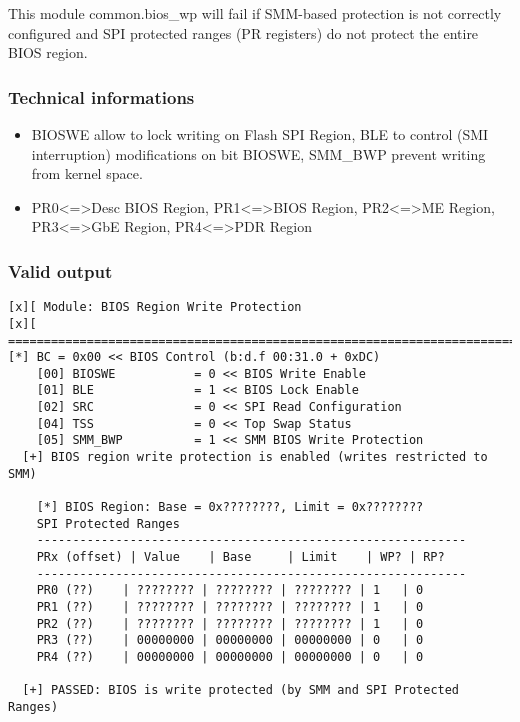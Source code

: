 This module common.bios\_wp will fail if SMM-based protection is not
correctly configured and SPI protected ranges (PR registers) do not
protect the entire BIOS region.

\hypertarget{technical-informations-12}{%
\subsubsection{Technical informations}\label{technical-informations-12}}

\begin{itemize}
\tightlist
\item
  BIOSWE allow to lock writing on Flash SPI Region, BLE to control (SMI
  interruption) modifications on bit BIOSWE, SMM\_BWP prevent writing
  from kernel space.
\item
  PR0\textless=\textgreater Desc BIOS Region,
  PR1\textless=\textgreater BIOS Region, PR2\textless=\textgreater ME
  Region, PR3\textless=\textgreater GbE Region,
  PR4\textless=\textgreater PDR Region
\end{itemize}

\hypertarget{valid-output-13}{%
\subsubsection{Valid output}\label{valid-output-13}}

\begin{verbatim}
[x][ Module: BIOS Region Write Protection
[x][ =======================================================================
[*] BC = 0x00 << BIOS Control (b:d.f 00:31.0 + 0xDC)
    [00] BIOSWE           = 0 << BIOS Write Enable 
    [01] BLE              = 1 << BIOS Lock Enable 
    [02] SRC              = 0 << SPI Read Configuration 
    [04] TSS              = 0 << Top Swap Status 
    [05] SMM_BWP          = 1 << SMM BIOS Write Protection 
  [+] BIOS region write protection is enabled (writes restricted to SMM)

    [*] BIOS Region: Base = 0x????????, Limit = 0x????????
    SPI Protected Ranges
    ------------------------------------------------------------
    PRx (offset) | Value    | Base     | Limit    | WP? | RP?
    ------------------------------------------------------------
    PR0 (??)    | ???????? | ???????? | ???????? | 1   | 0 
    PR1 (??)    | ???????? | ???????? | ???????? | 1   | 0 
    PR2 (??)    | ???????? | ???????? | ???????? | 1   | 0 
    PR3 (??)    | 00000000 | 00000000 | 00000000 | 0   | 0 
    PR4 (??)    | 00000000 | 00000000 | 00000000 | 0   | 0

  [+] PASSED: BIOS is write protected (by SMM and SPI Protected Ranges)
\end{verbatim}

